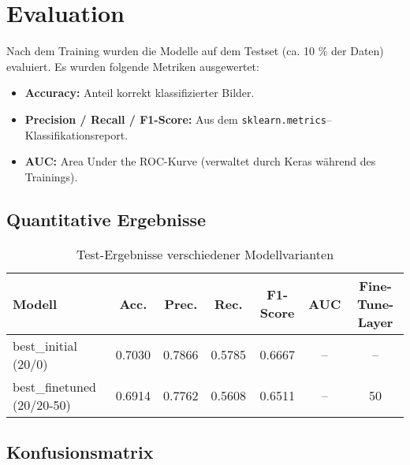 \chapter{Evaluation}
\label{chap:evaluation}

Nach dem Training wurden die Modelle auf dem Testset (ca. 10 \% der Daten) evaluiert. Es wurden folgende Metriken ausgewertet:
\begin{itemize}
  \item \textbf{Accuracy:} Anteil korrekt klassifizierter Bilder.  
  \item \textbf{Precision / Recall / F1-Score:} Aus dem \texttt{sklearn.metrics}–Klassifikationsreport.  
  \item \textbf{AUC:} Area Under the ROC-Kurve (verwaltet durch Keras während des Trainings).
    
\end{itemize}

\section{Quantitative Ergebnisse}
\begin{table}[h]
\centering
\caption{Test-Ergebnisse verschiedener Modellvarianten}
\label{tab:results}
\begin{tabular}{lcccccc}
\toprule
Modell                    & Acc. & Prec. & Rec. & F1-Score & AUC  & Fine-Tune-Layer\\
\midrule
best\_initial (20/0)      & 0.7030 & 0.7866 & 0.5785 & 0.6667 & –     & – \\
best\_finetuned (20/20-50)& 0.6914 & 0.7762 & 0.5608 & 0.6511 & –     & 50 \\
\bottomrule
\end{tabular}
\end{table}

\section{Konfusionsmatrix}

